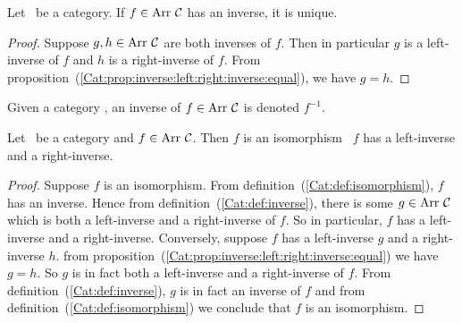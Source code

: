 \begin{prop}\label{Cat:prop:inverse:unique}
    Let \Cat\ be a category. If $f\in\arr\ \Cat$ has 
    an inverse, it is unique.
\end{prop}
\begin{proof}
    Suppose $g,h\in\arr\ \Cat$ are both inverses of $f$. Then in particular
    $g$ is a left-inverse of $f$ and $h$ is a right-inverse of $f$. From
    proposition~(\ref{Cat:prop:inverse:left:right:inverse:equal}), we have $g=h$.
\end{proof}

\begin{notation}\label{Cat:notation:inverse}
    Given a category \Cat, an inverse of $f\in\arr\ \Cat$ is denoted $f^{-1}$.
\end{notation}

\begin{prop}\label{Cat:prop:isomorphism:left:right}
    Let \Cat\ be a category and $f\in\arr\ \Cat$. Then $f$ is an isomorphism
    \ifand\ $f$ has a left-inverse and a right-inverse.
\end{prop}
\begin{proof}
    Suppose $f$ is an isomorphism. From definition~(\ref{Cat:def:isomorphism}),
    $f$ has an inverse. Hence from definition~(\ref{Cat:def:inverse}), there
    is some $g\in\mbox{\rm Arr}\ \mbox{$\cal C$}$ which is both a left-inverse and a right-inverse
    of $f$. So in particular, $f$ has a left-inverse and a right-inverse.
    Conversely, suppose $f$ has a left-inverse $g$ and a right-inverse $h$.
    from proposition~(\ref{Cat:prop:inverse:left:right:inverse:equal}) we 
    have $g=h$. So $g$ is in fact both a left-inverse and a right-inverse 
    of $f$. From definition~(\ref{Cat:def:inverse}), $g$ is in fact an
    inverse of $f$ and from definition~(\ref{Cat:def:isomorphism}) we conclude
    that $f$ is an isomorphism.
\end{proof}

